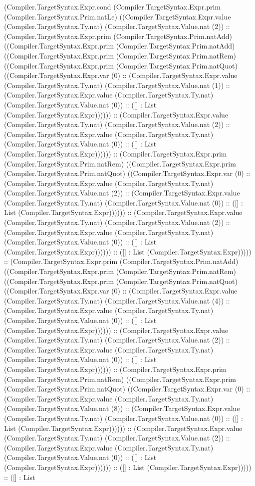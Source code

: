 \documentclass[11pt]{article}
\begin{document}
(Compiler.TargetSyntax.Expr.cond (Compiler.TargetSyntax.Expr.prim (Compiler.TargetSyntax.Prim.natLe) ((Compiler.TargetSyntax.Expr.value (Compiler.TargetSyntax.Ty.nat) (Compiler.TargetSyntax.Value.nat (2)) :: (Compiler.TargetSyntax.Expr.prim (Compiler.TargetSyntax.Prim.natAdd) ((Compiler.TargetSyntax.Expr.prim (Compiler.TargetSyntax.Prim.natAdd) ((Compiler.TargetSyntax.Expr.prim (Compiler.TargetSyntax.Prim.natRem) ((Compiler.TargetSyntax.Expr.prim (Compiler.TargetSyntax.Prim.natQuot) ((Compiler.TargetSyntax.Expr.var (0) :: (Compiler.TargetSyntax.Expr.value (Compiler.TargetSyntax.Ty.nat) (Compiler.TargetSyntax.Value.nat (1)) :: (Compiler.TargetSyntax.Expr.value (Compiler.TargetSyntax.Ty.nat) (Compiler.TargetSyntax.Value.nat (0)) :: ([] : List (Compiler.TargetSyntax.Expr)))))) :: (Compiler.TargetSyntax.Expr.value (Compiler.TargetSyntax.Ty.nat) (Compiler.TargetSyntax.Value.nat (2)) :: (Compiler.TargetSyntax.Expr.value (Compiler.TargetSyntax.Ty.nat) (Compiler.TargetSyntax.Value.nat (0)) :: ([] : List (Compiler.TargetSyntax.Expr)))))) :: (Compiler.TargetSyntax.Expr.prim (Compiler.TargetSyntax.Prim.natRem) ((Compiler.TargetSyntax.Expr.prim (Compiler.TargetSyntax.Prim.natQuot) ((Compiler.TargetSyntax.Expr.var (0) :: (Compiler.TargetSyntax.Expr.value (Compiler.TargetSyntax.Ty.nat) (Compiler.TargetSyntax.Value.nat (2)) :: (Compiler.TargetSyntax.Expr.value (Compiler.TargetSyntax.Ty.nat) (Compiler.TargetSyntax.Value.nat (0)) :: ([] : List (Compiler.TargetSyntax.Expr)))))) :: (Compiler.TargetSyntax.Expr.value (Compiler.TargetSyntax.Ty.nat) (Compiler.TargetSyntax.Value.nat (2)) :: (Compiler.TargetSyntax.Expr.value (Compiler.TargetSyntax.Ty.nat) (Compiler.TargetSyntax.Value.nat (0)) :: ([] : List (Compiler.TargetSyntax.Expr)))))) :: ([] : List (Compiler.TargetSyntax.Expr))))) :: (Compiler.TargetSyntax.Expr.prim (Compiler.TargetSyntax.Prim.natAdd) ((Compiler.TargetSyntax.Expr.prim (Compiler.TargetSyntax.Prim.natRem) ((Compiler.TargetSyntax.Expr.prim (Compiler.TargetSyntax.Prim.natQuot) ((Compiler.TargetSyntax.Expr.var (0) :: (Compiler.TargetSyntax.Expr.value (Compiler.TargetSyntax.Ty.nat) (Compiler.TargetSyntax.Value.nat (4)) :: (Compiler.TargetSyntax.Expr.value (Compiler.TargetSyntax.Ty.nat) (Compiler.TargetSyntax.Value.nat (0)) :: ([] : List (Compiler.TargetSyntax.Expr)))))) :: (Compiler.TargetSyntax.Expr.value (Compiler.TargetSyntax.Ty.nat) (Compiler.TargetSyntax.Value.nat (2)) :: (Compiler.TargetSyntax.Expr.value (Compiler.TargetSyntax.Ty.nat) (Compiler.TargetSyntax.Value.nat (0)) :: ([] : List (Compiler.TargetSyntax.Expr)))))) :: (Compiler.TargetSyntax.Expr.prim (Compiler.TargetSyntax.Prim.natRem) ((Compiler.TargetSyntax.Expr.prim (Compiler.TargetSyntax.Prim.natQuot) ((Compiler.TargetSyntax.Expr.var (0) :: (Compiler.TargetSyntax.Expr.value (Compiler.TargetSyntax.Ty.nat) (Compiler.TargetSyntax.Value.nat (8)) :: (Compiler.TargetSyntax.Expr.value (Compiler.TargetSyntax.Ty.nat) (Compiler.TargetSyntax.Value.nat (0)) :: ([] : List (Compiler.TargetSyntax.Expr)))))) :: (Compiler.TargetSyntax.Expr.value (Compiler.TargetSyntax.Ty.nat) (Compiler.TargetSyntax.Value.nat (2)) :: (Compiler.TargetSyntax.Expr.value (Compiler.TargetSyntax.Ty.nat) (Compiler.TargetSyntax.Value.nat (0)) :: ([] : List (Compiler.TargetSyntax.Expr)))))) :: ([] : List (Compiler.TargetSyntax.Expr))))) :: ([] : List 
\end{document}
